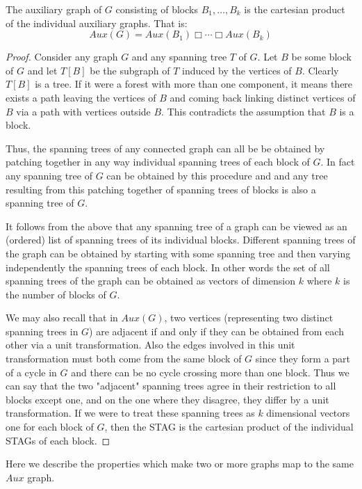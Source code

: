 \documentclass{llncs}
\begin{document}
\begin{theorem}
	The auxiliary graph of $G$ consisting of blocks $B_1,\ldots,B_k$ is the cartesian product of the individual auxiliary graphs. That is: \[Aux(G)=Aux(B_1)\Box \cdots \Box Aux(B_k)\]  
\end{theorem}

\begin{proof}
	Consider any graph $G$ and any spanning tree $T$ of $G$. Let $B$ be some block of $G$ and let $T[B]$ be the subgraph of $T$ induced by the vertices of $B$. Clearly $T[B]$ is a tree. If it were a forest with more than one component, it means there exists a path leaving the vertices of $B$ and coming back linking distinct vertices of $B$ via a path with vertices outside $B$. This contradicts the assumption that $B$ is a block. 
	
	Thus, the spanning trees of any connected graph can all be be obtained by patching together in any way individual spanning trees of each block of $G$. In fact any spanning tree of $G$ can be obtained by this procedure and  and any tree resulting from this patching together of spanning trees of blocks is also a spanning tree of $G$. 
	
	It follows from the above that any spanning tree of a graph can be viewed as an (ordered) list of spanning trees of its individual blocks. Different spanning trees of the graph can be obtained by starting with some spanning tree and then varying independently the spanning trees of each block. In other words the set of all spanning trees of the graph can be obtained as vectors of dimension $k$ where $k$ is the number of blocks of $G$. 
	
	We may also recall that in $Aux(G)$, two vertices (representing two distinct spanning trees in $G$) are adjacent if and only if they can be obtained from each other via a unit transformation. Also the edges involved in this unit transformation must both come from the same block of $G$ since they form a part of a cycle in $G$ and there can be no cycle crossing more than one block. Thus we can say that the two "adjacent" spanning trees agree in their restriction to all blocks except one, and on the one where they disagree, they differ by a unit transformation. If we were to treat these spanning trees as $k$ dimensional vectors one for each block of $G$, then the STAG is the cartesian product of the individual STAGs of each block.
\end{proof}

Here we describe the properties which make two or more graphs map to the same $Aux$ graph. 
\end{document}
